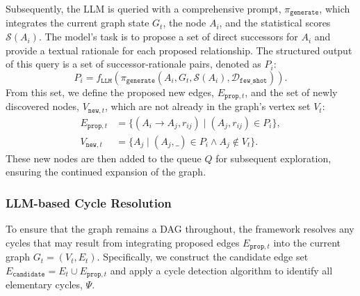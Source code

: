 Subsequently, the LLM is queried with a comprehensive prompt, $\pi_{\mathtt{generate}}$, which integrates the current graph state $G_t$, the node $A_i$, and the statistical scores $\mathcal{S}(A_i)$. The model's task is to propose a set of direct successors for $A_i$ and provide a textual rationale for each proposed relationship. The structured output of this query is a set of successor-rationale pairs, denoted as $P_i$:
\begin{equation}
    P_i = f_{\mathtt{LLM}}(\pi_{\mathtt{generate}}(A_i, G_t, \mathcal{S}(A_i), \mathcal{D}_{\mathtt{few\_shot}})).
\end{equation}
From this set, we define the proposed new edges, $E_{\mathtt{prop}, t}$, and the set of newly discovered nodes, $V_{\mathtt{new}, t}$, which are not already in the graph's vertex set $V_t$:
\begin{equation}
    \begin{aligned}
        E_{\mathtt{prop}, t} &= \{ (A_i \to A_j, r_{ij}) \mid (A_j, r_{ij}) \in P_i \}, \\
        V_{\mathtt{new}, t} &= \{ A_j \mid (A_j, \_) \in P_i \land A_j \notin V_t \}.
    \end{aligned}
\end{equation}
These new nodes are then added to the queue $Q$ for subsequent exploration, ensuring the continued expansion of the graph.%

\subsubsection{LLM-based Cycle Resolution}

To ensure that the graph remains a DAG throughout, the framework resolves any cycles that may result from integrating proposed edges $E_{\mathtt{prop}, t}$ into the current graph $G_t = (V_t, E_t)$. Specifically, we construct the candidate edge set $E_{\mathtt{candidate}} = E_t \cup E_{\mathtt{prop}, t}$ and apply a cycle detection algorithm to identify all elementary cycles, $\Psi$. 


